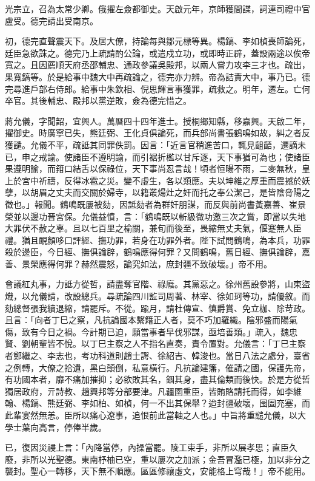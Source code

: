 \begin{pinyinscope}
光宗立，召為太常少卿。俄擢左僉都御史。天啟元年，京師獲間諜，詞連司禮中官盧受。德完請出受南京。

初，德完直聲震天下。及居大僚，持論每與鄒元標等異。楊鎬、李如楨喪師論死，廷臣急欲誅之。德完乃上疏請酌公論，或遣戍立功，或即時正辟，蓋設兩途以俟帝寬之。且因薦順天府丞邵輔忠、通政參議吳殿邦，以兩人嘗力攻李三才也。疏出，果寬鎬等。於是給事中魏大中再疏論之，德完亦力辨。帝為詰責大中，事乃已。德完尋進戶部右侍郎。給事中朱欽相、倪思輝言事獲罪，疏救之。明年，遷左。亡何卒官。其後輔忠、殿邦以黨逆敗，僉為德完惜之。

蔣允儀，字聞韶，宜興人。萬曆四十四年進士。授桐鄉知縣，移嘉興。天啟二年，擢御史。時廣寧已失，熊廷弼、王化貞俱論死，而兵部尚書張鶴鳴如故，糾之者反獲譴。允儀不平，疏詆其同罪佚罰。因言：「近言官稍進苦口，輒見齟齬，遷謫未已，申之戒諭。使諸臣不遵明諭，而引裾折檻以甘斥逐，天下事猶可為也；使諸臣果遵明諭，而箝口結舌以保祿位，天下事尚忍言哉！頃者恒暘不雨，二麥無秋，皇上於宮中祈禱，反得冰雹之災。變不虛生，各以類應。夫以坤維之厚重而震撼於妖孽，以胡眉之丈夫而交關於婦寺，以籍叢煬灶之奸而托之奉公潔己，是皆陰脅陽之徵也。」報聞。鶴鳴既屢被劾，因詆劾者為群奸朋謀，而反與前尚書黃嘉善、崔景榮並以邊功晉宮保。允儀益憤，言：「鶴鳴既以斬級微功邀三次之賞，即當以失地大罪伏不赦之辜。且以七百里之榆關，兼旬而後至，畏縮無丈夫氣，偃蹇無人臣禮。猶且靦顏哆口評經、撫功罪，若身在功罪外者。陛下試問鶴鳴，為本兵，功罪殺於邊臣，今日經、撫俱論辟，鶴鳴應得何罪？又問鶴鳴，舊日經、撫俱論辟，嘉善、景榮應得何罪？赫然震怒，論究如法，庶封疆不致破壞。」帝不用。

會議紅丸事，力詆方從哲，請盡奪官階、祿廕。其黨惡之。徐州舊設參將，山東盜熾，以允儀請，改設總兵。尋疏論四川監司周著、林宰、徐如珂等功，請優敘。而劾總督張我續退縮，請罷斥。不從。踰月，請杜傳宣、慎爵賞、免立枷、除苛政。且言：「向者丁巳之察，凡抗論國本繫籍正人者，莫不巧加羅織。陰邪盛而陽氣傷，致有今日之禍。今計期已迫，願當事者早伐邪謀，亟培善類。」疏入，魏忠賢、劉朝輩皆不悅。以丁巳主察之人不指名直奏，責令置對。允儀言：「丁巳主察者鄭繼之、李志也，考功科道則趙士諤、徐紹吉、韓浚也。當日八法之處分，臺省之例轉，大僚之拾遺，黑白顛倒，私意橫行。凡抗論建籓，催請之國，保護先帝，有功國本者，靡不痛加摧抑；必欲敗其名，錮其身，盡其倫類而後快。於是方從哲獨居政府，亓詩教、趙興邦等分部要津。凡疆圉重臣，皆賄賂請托而得，如李維翰、楊鎬、熊廷弼、李如柏、如楨，何一不出其保舉？迨封疆破壞，囹圄充塞，而此輩宴然無恙。臣所以痛心遼事，追恨前此當軸之人也。」中旨將重譴允儀，以大學士葉向高言，停俸半歲。

已，復因災祲上言：「內降當停，內操當罷。陵工束手，非所以展孝思；直臣久廢，非所以光聖德。東南杼柚已空，重以屢次之加派；金吾冒濫已極，加以非分之襲封。聖心一轉移，天下無不順應。區區修禳虛文，安能格上穹哉！」帝不能用。


\end{pinyinscope}
